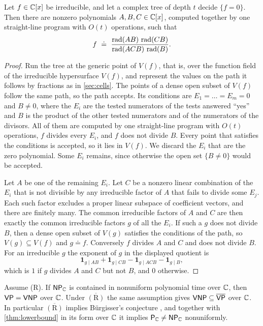 \begin{lemma}\label{lem:radpath}
Let $f\in\mathbb{C}[x]$ be irreducible, and let a complex tree of depth $t$ decide $\{f=0\}$. Then there are nonzero polynomials $A,B,C\in\mathbb{C}[x]$, computed together by one straight-line program with $O(t)$ operations, such that
\[
f\ \doteq\ \frac{\rad(AB)\,\rad(CB)}{\rad(ACB)\,\rad(B)} .
\]
\end{lemma}

\begin{proof}
Run the tree at the generic point of $V(f)$, that is, over the function field of the irreducible hypersurface $V(f)$, and represent the values on the path it follows by fractions as in \cref{sec:cells}. The points of a dense open subset of $V(f)$ follow the same path, so the path accepts. Its conditions are $E_1=\dots=E_m=0$ and $B\ne0$, where the $E_i$ are the tested numerators of the tests answered ``yes'' and $B$ is the product of the other tested numerators and of the numerators of the divisors. All of them are computed by one straight-line program with $O(t)$ operations, $f$ divides every $E_i$, and $f$ does not divide $B$. Every point that satisfies the conditions is accepted, so it lies in $V(f)$. We discard the $E_i$ that are the zero polynomial. Some $E_i$ remains, since otherwise the open set $\{B\ne0\}$ would be accepted.

Let $A$ be one of the remaining $E_i$. Let $C$ be a nonzero linear combination of the $E_i$ that is not divisible by any irreducible factor of $A$ that fails to divide some $E_j$. Each such factor excludes a proper linear subspace of coefficient vectors, and there are finitely many. The common irreducible factors of $A$ and $C$ are then exactly the common irreducible factors $g$ of all the $E_i$. If such a $g$ does not divide $B$, then a dense open subset of $V(g)$ satisfies the conditions of the path, so $V(g)\subseteq V(f)$ and $g\doteq f$. Conversely $f$ divides $A$ and $C$ and does not divide $B$. For an irreducible $g$ the exponent of $g$ in the displayed quotient is
\[
\mathbf 1_{g\mid AB}+\mathbf 1_{g\mid CB}-\mathbf 1_{g\mid ACB}-\mathbf 1_{g\mid B},
\]
which is $1$ if $g$ divides $A$ and $C$ but not $B$, and $0$ otherwise.
\end{proof}

\begin{proposition}\label{prop:radical}
Assume \textup{(R)}. If $\textsf{\upshape NP}_{\mathbb{C}}$ is contained in nonuniform polynomial time over $\mathbb{C}$, then $\textsf{\upshape VP}=\textsf{\upshape VNP}$ over $\mathbb{C}$. Under $\overline{\mathrm{(R)}}$ the same assumption gives $\textsf{\upshape VNP}\subseteq\overline{\textsf{\upshape VP}}$ over $\mathbb{C}$. In particular $\overline{\mathrm{(R)}}$ implies B\"urgisser's conjecture \cite[Conjecture~1.1]{Bur26}, and together with \cref{thm:lowerbound} in its form over $\mathbb{C}$ it implies $\textsf{\upshape P}_{\mathbb{C}}\ne\textsf{\upshape NP}_{\mathbb{C}}$ nonuniformly.
\end{proposition}

